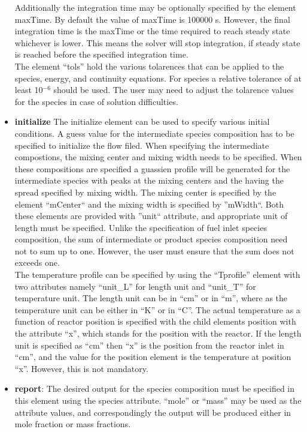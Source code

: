 \begin{itemize}
Additionally the integration time may be optionally specified by the element maxTime. By default the value of maxTime is 100000 s. However, the final integration time is the maxTime or the time required to reach steady state whichever is lower. This means the solver will stop integration, if steady state is reached before the specified integration time.\\

The element ``tols'' hold the various tolarences that can be applied to the species, energy, and continuity equations. For species a relative tolerance of at least 10$^{-6}$ should be used. The user may need to adjust the tolarence values for the species in case of solution difficulties.

\item \textbf{initialize} The initialize element can be used to specify various initial conditions. 
A guess value for the intermediate species composition has to be specified to initialize the flow filed. When specifying the intermediate compostions, the mixing center and mixing width needs to be specified. When these compositions are specified a guassien profile will be generated for the intermediate species with peaks at the mixing centers and the having the spread specified by mixing width. The mixing center is specified by the element ``mCenter`` and the mixing width is specified by ''mWidth``. Both these elements are provided with ''unit`` attribute, and appropriate unit of length must be specified. Unlike the specification of fuel inlet species composition, the sum of intermediate or product species composition need not to sum up to one. However, the user must ensure that the sum does not exceeds one.\\

The temperature profile can be specified by using the ``Tprofile'' element with two attributes namely ``unit\_L'' for length unit and ``unit\_T'' for temperature unit. The length unit can be in ``cm'' or in ``m'', where as the temperature unit can be either in ``K'' or in ``C''. The actual temperature as a function of reactor position is specified with the child elements position with the attribute ``x'', which stands for the position with the reactor. If the length unit is specified as ``cm'' then ``x'' is the position from the reactor inlet in ``cm'', and the value for the position element is the temperature at position ``x''. However, this is not mandatory.

\item \textbf{report}: The desired output for the species composition must be specified in this element using the species attribute. ``mole'' or ``mass'' may be used as the attribute values, and correspondingly the output will be produced either in mole fraction or mass fractions.


\end{itemize}
